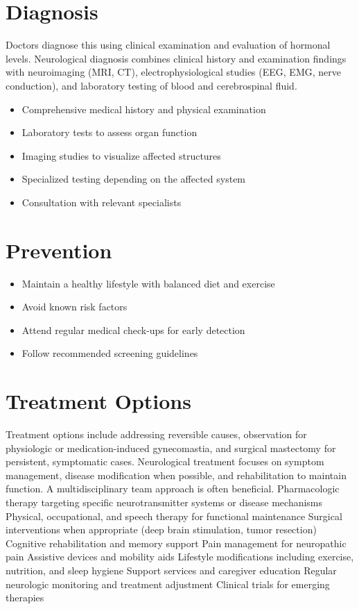 \section{Diagnosis}
Doctors diagnose this using clinical examination and evaluation of hormonal levels. Neurological diagnosis combines clinical history and examination findings with neuroimaging (MRI, CT), electrophysiological studies (EEG, EMG, nerve conduction), and laboratory testing of blood and cerebrospinal fluid.

\begin{itemize}[noitemsep]
  \item Comprehensive medical history and physical examination
  \item Laboratory tests to assess organ function
  \item Imaging studies to visualize affected structures
  \item Specialized testing depending on the affected system
  \item Consultation with relevant specialists
\end{itemize}
\section{Prevention}
\begin{itemize}[noitemsep]
  \item Maintain a healthy lifestyle with balanced diet and exercise
  \item Avoid known risk factors
  \item Attend regular medical check-ups for early detection
  \item Follow recommended screening guidelines
\end{itemize}
\section{Treatment Options}
Treatment options include addressing reversible causes, observation for physiologic or medication-induced gynecomastia, and surgical mastectomy for persistent, symptomatic cases. Neurological treatment focuses on symptom management, disease modification when possible, and rehabilitation to maintain function. A multidisciplinary team approach is often beneficial. Pharmacologic therapy targeting specific neurotransmitter systems or disease mechanisms Physical, occupational, and speech therapy for functional maintenance Surgical interventions when appropriate (deep brain stimulation, tumor resection) Cognitive rehabilitation and memory support Pain management for neuropathic pain Assistive devices and mobility aids Lifestyle modifications including exercise, nutrition, and sleep hygiene Support services and caregiver education Regular neurologic monitoring and treatment adjustment Clinical trials for emerging therapies

